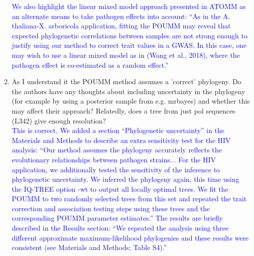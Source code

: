\documentclass[11pt]{article}
\begin{document}
\begin{enumerate}
    \textcolor{blue}{We also highlight the linear mixed model approach presented in ATOMM as an alternate means to take pathogen effects into account: ``As in the A. thaliana-X. arboricola application, fitting the POUMM may reveal that expected phylogenetic correlations between samples are not strong enough to justify using our method to correct trait values in a GWAS. In this case, one may wish to use a linear mixed model as in (Wang et al., 2018), where the pathogen effect is co-estimated as a random effect.''}
    \item As I understand it the POUMM method assumes a 'correct' phylogeny. Do the authors have any thoughts about including uncertainty in the phylogeny (for example by using a posterior sample from e.g. mrbayes) and whether this may affect their approach? Relatedly, does a tree from just pol sequences (L342) give enough resolution? \\
    \textcolor{blue}{This is correct. We added a section ``Phylogenetic uncertainty'' in the Materials and Methods to describe an extra sensitivity test for the HIV analysis: ``Our method assumes the phylogeny accurately reflects the evolutionary relationships between pathogen strains... For the HIV application, we additionally tested the sensitivity of the inference to phylogenetic uncertainty. We inferred the phylogeny again, this time using the IQ-TREE option -wt to output all locally optimal trees. We fit the POUMM to two randomly selected trees from this set and repeated the trait correction and association testing steps using these trees and the corresponding POUMM parameter estimates.'' The results are briefly described in the Results section: ``We repeated the analysis using three different approximate maximum-likelihood phylogenies and these results were consistent (see Materials and Methods; Table S4).''}
    

\end{enumerate}
\end{document}

